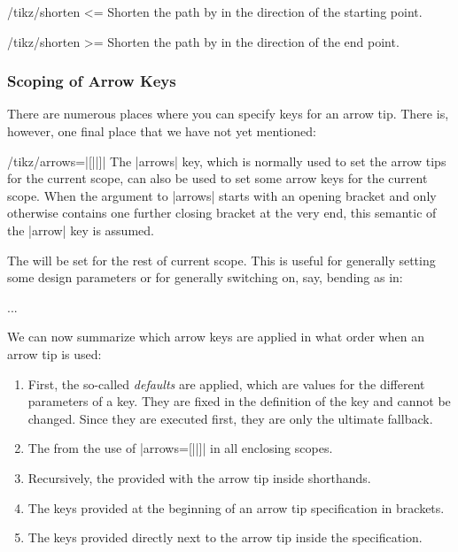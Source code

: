 \begin{key}{/tikz/shorten <=}
    Shorten the path by  in the direction of the starting point.
\end{key}

\begin{key}{/tikz/shorten >=}
    Shorten the path by  in the direction of the end point.
\end{key}


\subsubsection{Scoping of Arrow Keys}
\label{section-arrow-scopes}

There are numerous places where you can specify keys for an arrow tip. There
is, however, one final place that we have not yet mentioned:

\begin{key}{/tikz/arrows=|[||]|}
    The |arrows| key, which is normally used to set the arrow tips for the
    current scope, can also be used to set some arrow keys for the current
    scope. When the argument to |arrows| starts with an opening bracket and
    only otherwise contains one further closing bracket at the very end, this
    semantic of the |arrow| key is assumed.

    The  will be set for the rest of current scope. This is
    useful for generally setting some design parameters or for generally
    switching on, say, bending as in:
\begin{codeexample}
\tikz [arrows={[bend]}] ... %
\end{codeexample}
\end{key}

We can now summarize which arrow keys are applied in what order when an arrow
tip is used:
%
\begin{enumerate}
    \item First, the so-called \emph{defaults} are applied, which are values
        for the different parameters of a key. They are fixed in the
        definition of the key and cannot be changed. Since they are executed
        first, they are only the ultimate fallback.
    \item The  from the use of |arrows=[||]| in all
        enclosing scopes.
    \item Recursively, the  provided with the arrow tip inside
        shorthands.
    \item The keys provided at the beginning of an arrow tip specification in
        brackets.
    \item The keys provided directly next to the arrow tip inside the
        specification.
\end{enumerate}


